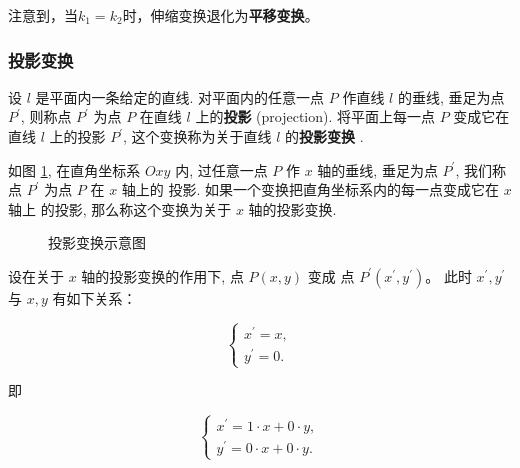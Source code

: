 注意到，当$k_1=k_2$时，伸缩变换退化为\textcolor{third}{\bf 平移变换}。


\subsubsection{投影变换}
\label{subsubsec:投影变换}

设 $l$ 是平面内一条给定的直线. 对平面内的任意一点 $P$ 作直线 $l$ 的垂线, 垂足为点 $P^{\prime}$, 则称点 $P^{\prime}$ 为点 $P$ 在直线 $l$ 上的\textcolor{third}{\bf 投影} (projection). 将平面上每一点 $P$ 变成它在直线 $l$ 上的投影 $P^{\prime}$, 这个变换称为关于直线 $l$ 的\textcolor{third}{\bf 投影变换}  .

如图 \ref{fig:投影变换}, 在直角坐标系 $O x y$ 内, 过任意一点 $P$ 作 $x$ 轴的垂线, 垂足为点 $P^{\prime}$, 我们称点 $P^{\prime}$ 为点 $P$ 在 $x$ 轴上的  投影. 如果一个变换把直角坐标系内的每一点变成它在 $x$ 轴上 的投影, 那么称这个变换为关于 $x$ 轴的投影变换.

\begin{figure}[h]
\centering
{}
\caption{投影变换示意图\label{fig:投影变换}}
\end{figure}

设在关于 $x$ 轴的投影变换的作用下, 点 $P(x, y)$ 变成 点 $P^{\prime}\left(x^{\prime}, y^{\prime}\right)$。
此时 $x^{\prime}, y^{\prime}$ 与 $x, y$ 有如下关系：

$$
\left\{\begin{array}{l}
x^{\prime}=x, \\
y^{\prime}=0 .
\end{array}\right.
$$

即

$$
\left\{\begin{array}{l}
x^{\prime}= 1 \cdot x + 0 \cdot y, \\
y^{\prime}= 0 \cdot x + 0 \cdot y.
\end{array}\right.
$$

